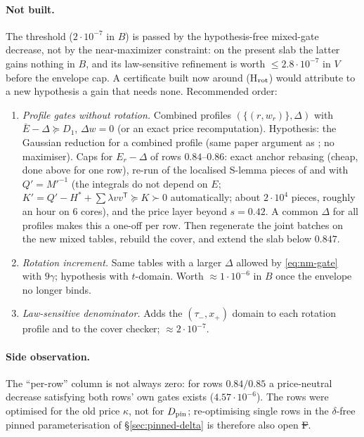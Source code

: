 \paragraph{Not built.} The threshold ($2\cdot10^{-7}$ in $B$) is passed by the hypothesis-free mixed-gate decrease, not by the near-maximizer constraint: on the present slab the latter
gains nothing in $B$, and its law-sensitive refinement is worth $\le2.8\cdot10^{-7}$ in $V$ before the envelope cap. A certificate built now around (H$_{\rm rot}$) would attribute to
a new hypothesis a gain that needs none. Recommended order:
\begin{enumerate}
\item \emph{Profile gates without rotation.} Combined profiles $(\{(r,w_r)\},\Delta)$ with $\bar E-\Delta\succeq D_1$, $\Delta w=0$ (or an exact price recomputation). Hypothesis: the
Gaussian reduction for a combined profile (same paper argument as ; no maximiser). Caps for $E_r-\Delta$ of rows $0.84$--$0.86$: exact anchor rebasing (cheap, done
above for one row), re-run of the localised S-lemma pieces of  and  with $Q'=M'^{-1}$ (the integrals do not depend on $E$;
$K'=Q'-H^*+\sum\lambda vv^{\mathsf T}\succeq K\succ0$ automatically; about $2\cdot10^4$ pieces, roughly an hour on 6 cores), and the price layer beyond $s=0.42$. A common $\Delta$ for all
profiles makes this a one-off per row. Then regenerate the joint batches on the new mixed tables, rebuild the cover, and extend the slab below $0.847$.
\item \emph{Rotation increment.} Same tables with a larger $\Delta$ allowed by \eqref{eq:nm-gate} with $9\gamma$; hypothesis  with $t$-domain. Worth $\approx1\cdot10^{-6}$ in
$B$ once the envelope no longer binds.
\item \emph{Law-sensitive denominator.} Adds the $(\tau_-,x_+)$ domain to each rotation profile and to the cover checker; $\approx2\cdot10^{-7}$.
\end{enumerate}
\paragraph{Side observation.} The ``per-row'' column is not always zero: for rows $0.84/0.85$ a price-neutral decrease satisfying both rows' own gates exists ($4.57\cdot10^{-6}$). The
rows were optimised for the old price $\kappa$, not for $D_{\rm pin}$; re-optimising single rows in the $\delta$-free pinned parameterisation of \S\ref{sec:pinned-delta} is therefore
also open \st{F}.


